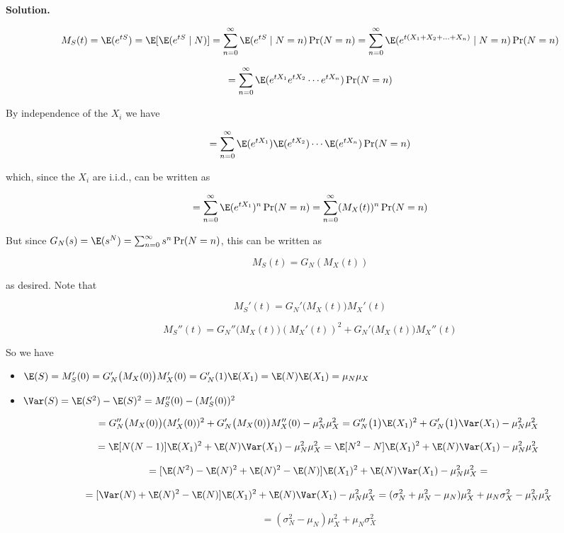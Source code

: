 \textbf{Solution.}

\[
M_S(t) = \E(e^{tS}) = \E[ \E(e^{tS} \mid N)] =\sum_{n=0}^\infty \E(e^{tS} \mid N = n) \Pr(N = n) =\sum_{n=0}^\infty \E(e^{t(X_1 + X_2 + \ldots + X_n)} \mid N = n) \Pr(N = n)
\]

\[
=\sum_{n=0}^\infty \E(e^{tX_1} e^{tX_2}\cdots e^{t X_n} ) \Pr(N = n)
\]

By independence of the \(X_i\) we have

\[
=\sum_{n=0}^\infty \E(e^{tX_1}) \E( e^{tX_2})\cdots \E( e^{t X_n}) \Pr(N = n)
\]

which, since the \(X_i\) are i.i.d., can be written as

\[
=\sum_{n=0}^\infty \E(e^{tX_1})^n \Pr(N = n) =\sum_{n=0}^\infty (M_X(t))^n \Pr(N = n)
\]

But since \(G_N(s) = \E(s^N) = \sum_{n=0}^\infty s^n \Pr(N = n)\), this can be written as

\[
M_S(t) = G_N(M_X(t))
\]

as desired. Note that

\[
M_S'(t) = G_N' \big( M_X(t) \big) M_X'(t)
\]

\[
M_S''(t) = G_N'' \big( M_X(t) \big) (M_X'(t))^2 + G_N' \big( M_X(t) \big) M_X''(t)
\]

So we have

\begin{itemize}

\item \(\E(S) = M_S'(0) =G_N' \big( M_X(0) \big) M_X'(0) = G_N'(1) \E(X_1) = \E(N) \E(X_1) = \mu_N \mu_X\)

\item \(\Var(S) =  \E(S^2) - \E(S)^2 = M_S''(0) - (M_S'(0))^2  \)

\[
= G_N'' \big( M_X(0) \big) (M_X'(0))^2 + G_N' \big( M_X(0) \big) M_X''(0) - \mu_N^2 \mu_X^2  = G_N'' \big( 1 \big) \E(X_1)^2 + G_N' \big( 1 \big) \Var(X_1) - \mu_N^2 \mu_X^2
\]

\[
= \E[N(N-1)] \E(X_1)^2 + \E(N) \Var(X_1) - \mu_N^2 \mu_X^2 = \E[N^2-N] \E(X_1)^2 + \E(N) \Var(X_1) - \mu_N^2 \mu_X^2
\]

\[
= [\E(N^2) - \E(N)^2 + \E(N)^2 - \E(N)] \E(X_1)^2 + \E(N) \Var(X_1) - \mu_N^2 \mu_X^2 = 
\]

\[
= [\Var(N) + \E(N)^2 - \E(N)] \E(X_1)^2 + \E(N) \Var(X_1) - \mu_N^2 \mu_X^2 = (\sigma_N^2 + \mu_N^2 -\mu_N)\mu_X^2 + \mu_N \sigma_X^2 - \mu_N^2 \mu_X^2
\]

\[
= \boxed{ (\sigma_N^2  -\mu_N)\mu_X^2 + \mu_N \sigma_X^2}
\]

\end{itemize}

